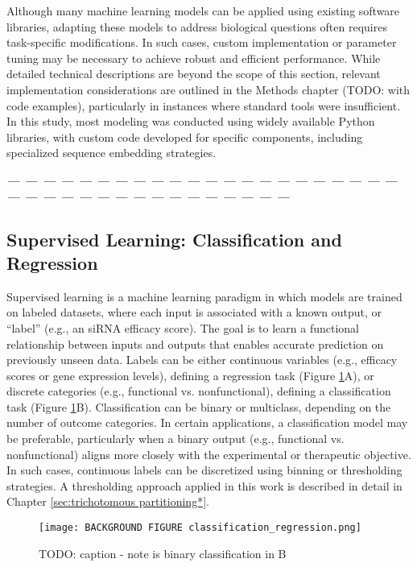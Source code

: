\documentclass{report}
\begin{document}
Although many machine learning models can be applied using existing software libraries, adapting these models to address biological questions often requires task-specific modifications. In such cases, custom implementation or parameter tuning may be necessary to achieve robust and efficient performance. While detailed technical descriptions are beyond the scope of this section, relevant implementation considerations are outlined in the Methods chapter (TODO: with code examples), particularly in instances where standard tools were insufficient. In this study, most modeling was conducted using widely available Python libraries, with custom code developed for specific components, including specialized sequence embedding strategies.


\textbf{\textit{--- --- --- --- --- --- --- --- --- --- --- --- --- --- --- --- --- --- --- --- --- --- --- --- --- --- --- --- --- --- --- --- --- --- --- --- --- ---}}


\subsection{Supervised Learning: Classification and Regression}

Supervised learning is a machine learning paradigm in which models are trained on labeled datasets, where each input is associated with a known output, or “label” (e.g., an siRNA efficacy score). The goal is to learn a functional relationship between inputs and outputs that enables accurate prediction on previously unseen data. Labels can be either continuous variables (e.g., efficacy scores or gene expression levels), defining a regression task (Figure \ref{fig:classification vs regression}A), or discrete categories (e.g., functional vs. nonfunctional), defining a classification task (Figure \ref{fig:classification vs regression}B). Classification can be binary or multiclass, depending on the number of outcome categories. In certain applications, a classification model may be preferable, particularly when a binary output (e.g., functional vs. nonfunctional) aligns more closely with the experimental or therapeutic objective. In such cases, continuous labels can be discretized using binning or thresholding strategies. A thresholding approach applied in this work is described in detail in Chapter \ref{sec:trichotomous partitioning*}.

\begin{figure}
    \centering
    \texttt{[image: BACKGROUND FIGURE classification\_regression.png]}
    \caption{TODO: caption - note is binary classification in B}
    \label{fig:classification vs regression}
\end{figure}
\end{document}
